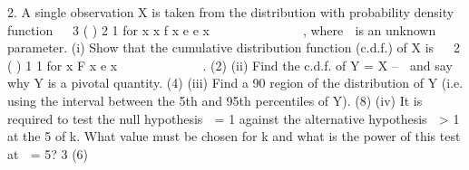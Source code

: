 
2. A single observation X is taken from the distribution with probability density function
 
3
( ) 2 1 for x x f x e e x  
         ,
where  is an unknown parameter.
(i) Show that the cumulative distribution function (c.d.f.) of X is
 
2
( ) 1 1 for x F x e x 
         .
(2)
(ii) Find the c.d.f. of Y = X –  and say why Y is a pivotal quantity.
(4)
(iii) Find a 90%
  region of the distribution of Y (i.e. using the interval between the 5th and 95th
                                   percentiles of Y).
(8)
(iv) It is required to test the null hypothesis  = 1 against the alternative hypothesis
 > 1 at the 5%
of k. What value must be chosen for k and what is the power of this test at
 = 5?
  3
(6)
